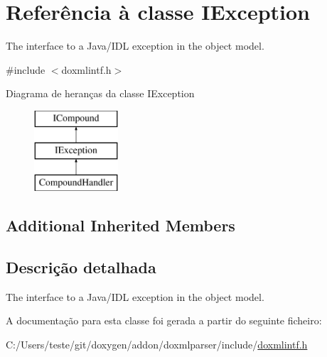 \hypertarget{class_i_exception}{\section{Referência à classe I\-Exception}
\label{class_i_exception}
}


The interface to a Java/\-I\-D\-L exception in the object model.  




{\ttfamily \#include $<$doxmlintf.\-h$>$}

Diagrama de heranças da classe I\-Exception\begin{figure}[H]
\begin{center}
\leavevmode
\includegraphics[height=3.000000cm]{class_i_exception}
\end{center}
\end{figure}
\subsection*{Additional Inherited Members}


\subsection{Descrição detalhada}
The interface to a Java/\-I\-D\-L exception in the object model. 

A documentação para esta classe foi gerada a partir do seguinte ficheiro\-:\begin{DoxyCompactItemize}
\item 
C\-:/\-Users/teste/git/doxygen/addon/doxmlparser/include/\hyperlink{include_2doxmlintf_8h}{doxmlintf.\-h}\end{DoxyCompactItemize}
